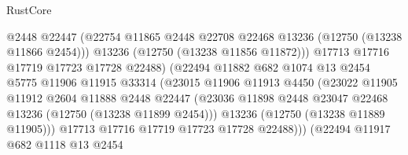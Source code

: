 \begin{lexlean}{RustCore}
\begin{coremodule}
                                    @2448
                                    @22447
                                    (@22754
                                      @11865
                                      @2448
                                      @22708
                                      @22468
                                      @13236
                                      (@12750 (@13238 @11866 @2454)))
                                    @13236
                                    (@12750 (@13238 @11856 @11872)))
                                  @17713
                                  @17716
                                  @17719
                                  @17723
                                  @17728
                                  @22488)
                                (@22494
                                  @11882
                                  @682
                                  @1074
                                  @13
                                  @2454
                                  @5775
                                  @11906
                                  @11915
                                  @33314
                                  (@23015
                                    @11906
                                    @11913
                                    @4450
                                    (@23022
                                      @11905
                                      @11912
                                      @2604
                                      @11888
                                      @2448
                                      @22447
                                      (@23036
                                        @11898
                                        @2448
                                        @23047
                                        @22468
                                        @13236
                                        (@12750 (@13238 @11899 @2454)))
                                      @13236
                                      (@12750 (@13238 @11889 @11905)))
                                    @17713
                                    @17716
                                    @17719
                                    @17723
                                    @17728
                                    @22488)))
                              (@22494
                                @11917
                                @682
                                @1118
                                @13
                                @2454

\end{coremodule}
\end{lexlean}
